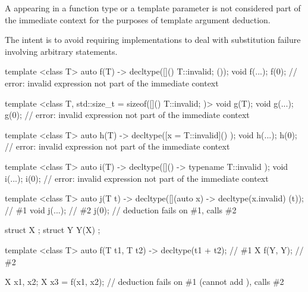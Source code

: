\pnum
A  appearing in a function type
or a template parameter is not considered part of the immediate context
for the purposes of template argument deduction.
\begin{note}
The intent is to avoid requiring implementations to deal with
substitution failure involving arbitrary statements.
\begin{example}
\begin{codeblock}
template <class T>
  auto f(T) -> decltype([]() { T::invalid; } ());
void f(...);
f(0);               // error: invalid expression not part of the immediate context

template <class T, std::size_t = sizeof([]() { T::invalid; })>
  void g(T);
void g(...);
g(0);               // error: invalid expression not part of the immediate context

template <class T>
  auto h(T) -> decltype([x = T::invalid]() { });
void h(...);
h(0);               // error: invalid expression not part of the immediate context

template <class T>
  auto i(T) -> decltype([]() -> typename T::invalid { });
void i(...);
i(0);               // error: invalid expression not part of the immediate context

template <class T>
  auto j(T t) -> decltype([](auto x) -> decltype(x.invalid) { } (t));   // \#1
void j(...);                                                            // \#2
j(0);               // deduction fails on \#1, calls \#2
\end{codeblock}
\end{example}
\end{note}

\pnum
\begin{example}
\begin{codeblock}
struct X { };
struct Y {
  Y(X) {}
};

template <class T> auto f(T t1, T t2) -> decltype(t1 + t2);     // \#1
X f(Y, Y);                                                      // \#2

X x1, x2;
X x3 = f(x1, x2);   // deduction fails on \#1 (cannot add ), calls \#2
\end{codeblock}
\end{example}

